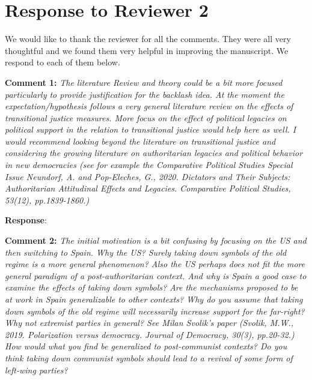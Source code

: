 \documentclass[12pt, a4paper, notitlepage]{article}
\begin{document}
\newpage
\section*{Response to Reviewer 2}

We would like to thank the reviewer for all the comments. They were all very thoughtful and we found them very helpful in improving the manuscript. We respond to each of them below.

\textbf{Comment 1:} \textit{The literature Review and theory could be a bit more focused particularly to provide justification for the backlash idea. At the moment the expectation/hypothesis follows a very general literature review on the effects of transitional justice measures. More focus on the effect of political legacies on political support in the relation to transitional justice would help here as well. I would recommend looking beyond the literature on transitional justice and considering the growing literature on authoritarian legacies and political behavior in new democracies (see for example the Comparative Political Studies Special Issue Neundorf, A. and Pop-Eleches, G., 2020. Dictators and Their Subjects: Authoritarian Attitudinal Effects and Legacies. Comparative Political Studies, 53(12), pp.1839-1860.)}

\textbf{Response}: {\color{red}{pending LAIA}}

\textbf{Comment 2:} \textit{The initial motivation is a bit confusing by focusing on the US and then switching to Spain. Why the US? Surely taking down symbols of the old regime is a more general phenomenon? Also the US perhaps does not fit the more general paradigm of a post-authoritarian context. And why is Spain a good case to examine the effects of taking down symbols? Are the mechanisms proposed to be at work in Spain generalizable to other contexts? Why do you assume that taking down symbols of the old regime will necessarily increase support for the far-right? Why not extremist parties in general? See Milan Svolik’s paper (Svolik, M.W., 2019. Polarization versus democracy. Journal of Democracy, 30(3), pp.20-32.) How would what you find be generalized to post-communist contexts? Do you think taking down communist symbols should lead to a revival of some form of left-wing parties?}
\end{document}
